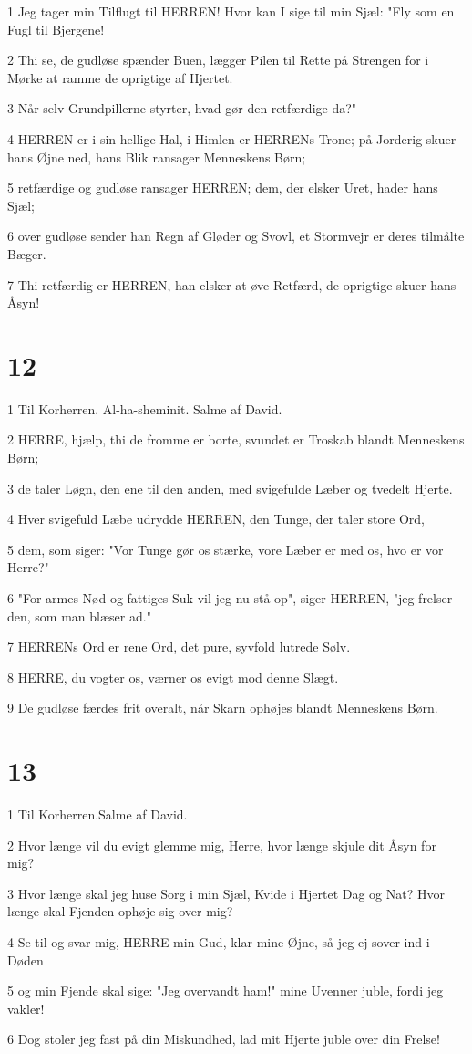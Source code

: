 \par 1 Jeg tager min Tilflugt til HERREN! Hvor kan I sige til min Sjæl: "Fly som en Fugl til Bjergene!
\par 2 Thi se, de gudløse spænder Buen, lægger Pilen til Rette på Strengen for i Mørke at ramme de oprigtige af Hjertet.
\par 3 Når selv Grundpillerne styrter, hvad gør den retfærdige da?"
\par 4 HERREN er i sin hellige Hal, i Himlen er HERRENs Trone; på Jorderig skuer hans Øjne ned, hans Blik ransager Menneskens Børn;
\par 5 retfærdige og gudløse ransager HERREN; dem, der elsker Uret, hader hans Sjæl;
\par 6 over gudløse sender han Regn af Gløder og Svovl, et Stormvejr er deres tilmålte Bæger.
\par 7 Thi retfærdig er HERREN, han elsker at øve Retfærd, de oprigtige skuer hans Åsyn!

\chapter{12}

\par 1 Til Korherren. Al-ha-sheminit. Salme af David.
\par 2 HERRE, hjælp, thi de fromme er borte, svundet er Troskab blandt Menneskens Børn;
\par 3 de taler Løgn, den ene til den anden, med svigefulde Læber og tvedelt Hjerte.
\par 4 Hver svigefuld Læbe udrydde HERREN, den Tunge, der taler store Ord,
\par 5 dem, som siger: "Vor Tunge gør os stærke, vore Læber er med os, hvo er vor Herre?"
\par 6 "For armes Nød og fattiges Suk vil jeg nu stå op", siger HERREN, "jeg frelser den, som man blæser ad."
\par 7 HERRENs Ord er rene Ord, det pure, syvfold lutrede Sølv.
\par 8 HERRE, du vogter os, værner os evigt mod denne Slægt.
\par 9 De gudløse færdes frit overalt, når Skarn ophøjes blandt Menneskens Børn.

\chapter{13}

\par 1 Til Korherren.Salme af David.
\par 2 Hvor længe vil du evigt glemme mig, Herre, hvor længe skjule dit Åsyn for mig?
\par 3 Hvor længe skal jeg huse Sorg i min Sjæl, Kvide i Hjertet Dag og Nat? Hvor længe skal Fjenden ophøje sig over mig?
\par 4 Se til og svar mig, HERRE min Gud, klar mine Øjne, så jeg ej sover ind i Døden
\par 5 og min Fjende skal sige: "Jeg overvandt ham!" mine Uvenner juble, fordi jeg vakler!
\par 6 Dog stoler jeg fast på din Miskundhed, lad mit Hjerte juble over din Frelse!

